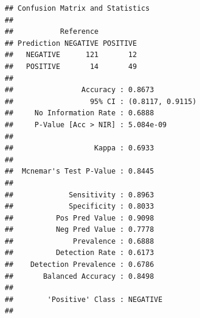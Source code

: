 \documentclass[
]{article}
\newenvironment{Shaded}{\begin{snugshade}}{\end{snugshade}}
\newcommand{\CommentTok}[1]{\textcolor[rgb]{0.56,0.35,0.01}{\textit{#1}}}
\newcommand{\FunctionTok}[1]{\textcolor[rgb]{0.13,0.29,0.53}{\textbf{#1}}}
\newcommand{\NormalTok}[1]{#1}
\newcommand{\OtherTok}[1]{\textcolor[rgb]{0.56,0.35,0.01}{#1}}
\newcommand{\SpecialCharTok}[1]{\textcolor[rgb]{0.81,0.36,0.00}{\textbf{#1}}}
\newcommand{\StringTok}[1]{\textcolor[rgb]{0.31,0.60,0.02}{#1}}
\begin{document}
\begin{Shaded}
\end{Shaded}

\begin{verbatim}
## Confusion Matrix and Statistics
## 
##           Reference
## Prediction NEGATIVE POSITIVE
##   NEGATIVE      121       12
##   POSITIVE       14       49
##                                           
##                Accuracy : 0.8673          
##                  95% CI : (0.8117, 0.9115)
##     No Information Rate : 0.6888          
##     P-Value [Acc > NIR] : 5.084e-09       
##                                           
##                   Kappa : 0.6933          
##                                           
##  Mcnemar's Test P-Value : 0.8445          
##                                           
##             Sensitivity : 0.8963          
##             Specificity : 0.8033          
##          Pos Pred Value : 0.9098          
##          Neg Pred Value : 0.7778          
##              Prevalence : 0.6888          
##          Detection Rate : 0.6173          
##    Detection Prevalence : 0.6786          
##       Balanced Accuracy : 0.8498          
##                                           
##        'Positive' Class : NEGATIVE        
## 
\end{verbatim}

\begin{Shaded}
\end{Shaded}
\end{document}
